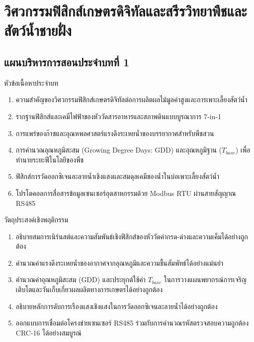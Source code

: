 \chapter{วิศวกรรมฟิสิกส์เกษตรดิจิทัลและสรีรวิทยาพืชและสัตว์น้ำชายฝั่ง}
\label{chap:ch01}

\section*{แผนบริหารการสอนประจำบทที่ 1}

\begin{planbox}{หัวข้อเนื้อหาประจำบท}
\begin{enumerate}[topsep=2pt, itemsep=1pt, partopsep=0pt, parsep=0pt, leftmargin=1.5em]
    \item ความสำคัญของวิศวกรรมฟิสิกส์เกษตรดิจิทัลต่อการผลิตผลไม้มูลค่าสูงและการเพาะเลี้ยงสัตว์น้ำ
    \item รากฐานฟิสิกส์และเคมีไฟฟ้าของหัววัดสารอาหารและสภาพดินแบบบูรณาการ 7-in-1
    \item การแพร่ของก๊าซและอุณหพลศาสตร์แรงดึงระเหยน้ำของบรรยากาศสำหรับพืชสวน
    \item การคำนวณอุณหภูมิสะสม (Growing Degree Days: GDD) และอุณหภูมิฐาน ($T_{base}$) เพื่อทำนายระยะฟีโนโลยีของพืช
    \item ฟิสิกส์การวัดออกซิเจนละลายน้ำเชิงแสงและสมดุลเคมีของน้ำในบ่อเพาะเลี้ยงสัตว์น้ำ
    \item โปรโตคอลการสื่อสารข้อมูลเซนเซอร์อุตสาหกรรมด้วย Modbus RTU ผ่านสายสัญญาณ RS485
\end{enumerate}
\end{planbox}

\begin{planbox}{วัตถุประสงค์เชิงพฤติกรรม}
\begin{enumerate}[topsep=2pt, itemsep=1pt, partopsep=0pt, parsep=0pt, leftmargin=1.5em]
    \item อธิบายสมการเนิร์นสต์และความสัมพันธ์เชิงฟิสิกส์ของหัววัดค่ากรด-ด่างและความเค็มได้อย่างถูกต้อง
    \item คำนวณค่าแรงดึงระเหยน้ำของอากาศจากอุณหภูมิและความชื้นสัมพัทธ์ได้อย่างแม่นยำ
    \item คำนวณค่าอุณหภูมิสะสม (GDD) และประยุกต์ใช้ค่า $T_{base}$ ในการวางแผนพยากรณ์การเจริญเติบโตและวันเก็บเกี่ยวผลผลิตทางการเกษตรได้อย่างถูกต้อง
    \item อธิบายหลักการดับการเรืองแสงเชิงแสงในการวัดออกซิเจนละลายน้ำได้อย่างถูกต้อง
    \item ออกแบบการเชื่อมต่อโครงข่ายเซนเซอร์ RS485 ร่วมกับการคำนวณรหัสตรวจสอบความถูกต้อง CRC-16 ได้อย่างสมบูรณ์
\end{enumerate}
\end{planbox}

